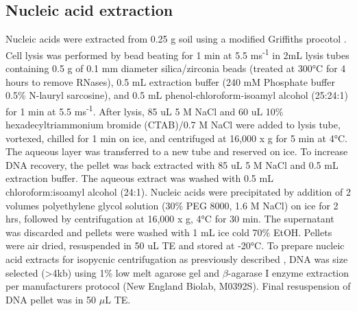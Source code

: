 \subsection{Nucleic acid extraction}
Nucleic acids were extracted from 0.25 g soil using a modified Griffiths
procotol \cite{Griffiths_2000}. Cell lysis was performed by bead beating for
1 min at 5.5 ms\textsuperscript{-1} in 2mL lysis tubes containing 0.5 g of 0.1
mm diameter silica/zirconia beads (treated at 300°C for 4 hours to remove
RNases), 0.5 mL extraction buffer (240 mM Phosphate buffer 0.5\% N-lauryl
sarcosine), and 0.5 mL phenol-chloroform-isoamyl alcohol (25:24:1) for 1 min at
5.5 ms\textsuperscript{-1}. After lysis, 85 uL 5 M NaCl and 60 uL 10\%
hexadecyltriammonium bromide (CTAB)/0.7 M NaCl were added to lysis tube,
vortexed, chilled for 1 min on ice, and centrifuged at 16,000 x g for 5 min at
4°C. The aqueous layer was transferred to a new tube and reserved on ice. To
increase DNA recovery, the pellet was back extracted with 85 uL 5 M NaCl and
0.5 mL extraction buffer. The aqueous extract was washed with 0.5 mL
chloroform:isoamyl alcohol (24:1). Nucleic acids were precipitated by addition
of 2 volumes polyethylene glycol solution (30\% PEG 8000, 1.6 M NaCl) on ice
for 2 hrs, followed by centrifugation at 16,000 x g, 4°C for 30 min. The
supernatant was discarded and pellets were washed with 1 mL ice cold 70\% EtOH.
Pellets were air dried, resuspended in 50 uL TE and stored at -20°C. To prepare
nucleic acid extracts for isopycnic centrifugation as presviously described
\cite{Buckley_2007}, DNA was size selected (\textgreater 4kb) using 1\% low
melt agarose gel and $\beta$-agarase I enzyme extraction per manufacturers
protocol (New England Biolab, M0392S).  Final resuspension of DNA pellet was in
50 $\mu$L TE.   



